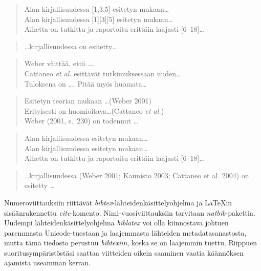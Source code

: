\documentclass[globalnumbering,centeredcaptions]{tutthesis/tutthesis} %
\begin{document}
  \begin{quotation}
  Alan kirjallisuudessa [1,3,5] esitetyn mukaan\ldots\\
  Alan kirjallisuudessa [1][3][5] esitetyn mukaan\ldots\\
  Aihetta on tutkittu ja raportoitu erittäin laajasti [6--18]\ldots
  \end{quotation}
    
  \begin{quotation}
  \ldots kirjallisuudessa \citep{Weber2001,Kaunisto2003,Cattaneo2004} on esitetty\ldots
  \end{quotation}
\else
  \begin{quotation}
  Weber väittää, että \ldots \cite{Weber2001}.\\
  Cattaneo \emph{et al.} esittävät tutkimuksessaan \cite{Cattaneo2004} uuden\ldots\\
  Tuloksena on \ldots \cite[s.~23]{Weber2001}. Pitää myös huomata\ldots \cite[s.~33--36]{Weber2001}
  \end{quotation}

  \begin{quotation}
  Esitetyn teorian mukaan \ldots (Weber 2001)\\
  Erityisesti on huomioitava\ldots (Cattaneo \emph{et al.})\\
  Weber (2001, s.~230) on todennut \ldots
  \end{quotation}
    
  \begin{quotation}
  Alan kirjallisuudessa \cite{Weber2001,Cattaneo2004,Kaunisto2003} esitetyn mukaan\ldots\\
  Alan kirjallisuudessa \cite{Weber2001}\cite{Cattaneo2004}\cite{Kaunisto2003} esitetyn mukaan\ldots\\
  Aihetta on tutkittu ja raportoitu erittäin laajasti [6--18]\ldots %
  \end{quotation}
    
  \begin{quotation}
  \ldots kirjallisuudessa (Weber 2001; Kaunisto 2003; Cattaneo et al. 2004) on esitetty \ldots
  \end{quotation}
\fi

Numeroviittauksiin riittävät \emph{bibtex}-lähteidenkäsittelyohjelma ja LaTeXin sisäänrakennettu \emph{cite}-komento.
Nimi-vuosiviittauksiin tarvitaan \emph{natbib}-pakettia.
Uudempi lähteidenkäsittelyohjelma \emph{biblatex} voi olla kiinnostava johtuen paremmasta Unicode-tuestaan ja laajemmasta lähteiden metadatasanastosta, mutta tämä tiedosto perustuu \emph{bibtexiin}, koska se on laajemmin tuettu.
Riippuen suoritusympäristöstäsi saattaa viitteiden oikein saaminen vaatia käännöksen ajamista useamman kerran.
\end{document}
